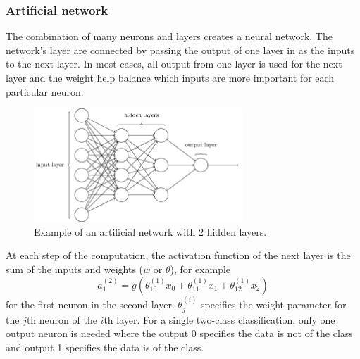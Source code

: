 \documentclass[CS5104-Notes.tex]{subfiles}
\begin{document}
\subsubsection{Artificial network}
The combination of many neurons and layers creates a neural network. The network's layer are connected by passing the output of one layer in as the inputs to the next layer. In most cases, all output from one layer is used for the next layer and the weight help balance which inputs are more important for each particular neuron.
\begin{figure}[H]
  \centering
  \includegraphics[width=0.7\textwidth, keepaspectratio]{imgs/artificial-network.png}
  \caption{Example of an artificial network with 2 hidden layers.}
\end{figure}
\noindent
At each step of the computation, the activation function of the next layer is the sum of the inputs and weights ($w$ or $\theta$), for example
\begin{equation}
a_{1}^{(2)} = g(\theta_{10}^{(1)}x_{0} + \theta_{11}^{(1)}x_{1} + \theta_{12}^{(1)}x_{2})
\end{equation}
for the first neuron in the second layer. $\theta_{j}^{(i)}$ specifies the weight parameter for the $j$th neuron of the $i$th layer. For a single two-class classification, only one output neuron is needed where the output 0 specifies the data is not of the class and output 1 specifies the data is of the class.
\end{document}

